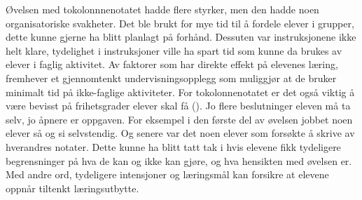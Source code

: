 \documentclass[main.tex]{subfiles}
\begin{document}
\newline
\newline
Øvelsen med tokolonnnenotatet hadde flere styrker, men den hadde noen organisatoriske svakheter. 
Det ble brukt for mye tid til å fordele elever i grupper, dette kunne gjerne ha blitt planlagt på 
forhånd. Dessuten var instruksjonene ikke helt klare, tydelighet i instruksjoner ville ha spart tid 
som kunne da brukes av elever i faglig aktivitet. Av faktorer som har direkte effekt på elevenes 
læring, fremhever  et gjennomtenkt undervisningsopplegg som muliggjør at 
de bruker minimalt tid på ikke-faglige aktiviteter. For tokolonnenotatet er det også viktig å være 
bevisst på frihetsgrader elever skal få (). Jo flere beslutninger eleven 
må ta selv, jo åpnere er oppgaven. For eksempel i den første del av øvelsen jobbet noen elever 
så og si selvstendig. Og senere var det noen elever som forsøkte å skrive av hverandres notater.
Dette kunne ha blitt tatt tak i hvis elevene fikk tydeligere begrensninger på hva de kan og ikke
kan gjøre, og hva hensikten med øvelsen er. Med andre ord, tydeligere intensjoner og læringsmål
kan forsikre at elevene oppnår tiltenkt læringsutbytte. 
\end{document}
